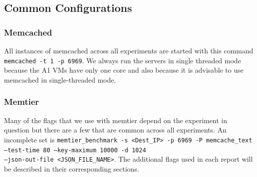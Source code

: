 \documentclass[11pt,a4paper]{article}
\begin{document}
\subsection{Common Configurations}
\subsubsection{Memcached}
All instances of memcached across all experiments are started with this command \texttt{memcached -t 1 -p 6969}. We always run the servers in single threaded mode because the A1 VMs have only one core and also because it is advisable to use memcached in single-threaded mode.

\subsubsection{Memtier}
Many of the flags that we use with memtier depend on the experiment in question but there are a few that are common across all experiments. An incomplete set is \texttt{memtier\_benchmark -s <Dest\_IP> -p 6969 -P memcache\_text --test-time 80 --key-maximum 10000 -d 1024 \\
	--json-out-file <JSON\_FILE\_NAME>}. The additional  flags used in each report will be described in their corresponding sections.
\end{document}
